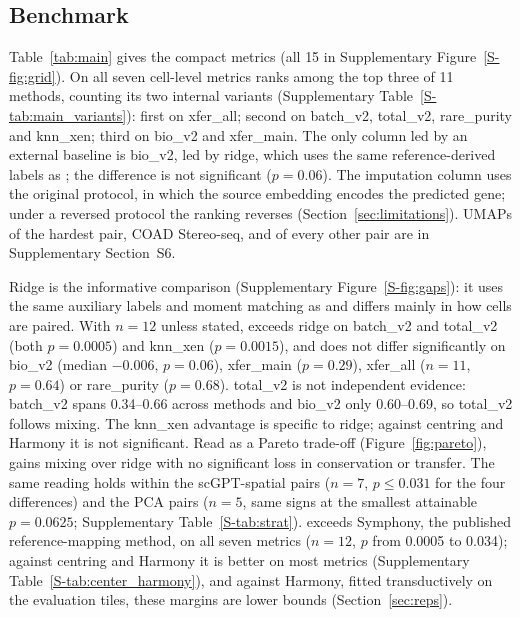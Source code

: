 \subsection{Benchmark}\label{sec:res_bench}
Table~\ref{tab:main} gives the compact metrics (all 15 in Supplementary Figure~\ref{S-fig:grid}). On all seven
cell-level metrics \frost ranks among the top three of 11 methods, counting its two internal variants
(Supplementary Table~\ref{S-tab:main_variants}): first on
xfer\_all; second on batch\_v2, total\_v2, rare\_purity and knn\_xen; third on bio\_v2 and xfer\_main. The only column led by an external baseline is bio\_v2, led by ridge, which uses the same
reference-derived labels as \frost; the difference is not significant ($p=0.06$). The imputation column
uses the original protocol, in which the source embedding encodes the predicted gene; under a reversed protocol the
ranking reverses (Section~\ref{sec:limitations}). UMAPs of the hardest pair, COAD Stereo-seq, and of every other pair are in
Supplementary Section~S6.

Ridge is the informative comparison (Supplementary Figure~\ref{S-fig:gaps}): it uses the same auxiliary labels and
moment matching as \frost and differs mainly in how cells are paired. With $n=12$ unless stated, \frost exceeds ridge
on batch\_v2 and total\_v2 (both $p=0.0005$) and knn\_xen ($p=0.0015$), and does not differ significantly on bio\_v2
(median $-0.006$, $p=0.06$), xfer\_main ($p=0.29$), xfer\_all ($n=11$, $p=0.64$) or rare\_purity ($p=0.68$). total\_v2 is not independent evidence: batch\_v2 spans 0.34--0.66 across methods
and bio\_v2 only 0.60--0.69, so total\_v2 follows mixing. The knn\_xen advantage is specific to ridge; against
centring and Harmony it is not significant. Read as a Pareto trade-off (Figure~\ref{fig:pareto}), \frost gains mixing over ridge
with no significant loss in conservation or transfer. The same
reading holds within the scGPT-spatial pairs ($n=7$, $p\le0.031$ for the four differences) and the PCA pairs ($n=5$,
same signs at the smallest attainable $p=0.0625$; Supplementary Table~\ref{S-tab:strat}). \frost exceeds Symphony, the published reference-mapping method, on all
seven metrics ($n=12$, $p$ from 0.0005 to 0.034); against centring and Harmony it is better on most metrics (Supplementary Table~\ref{S-tab:center_harmony}), and
against Harmony, fitted transductively on the evaluation tiles, these margins are lower bounds (Section~\ref{sec:reps}).

